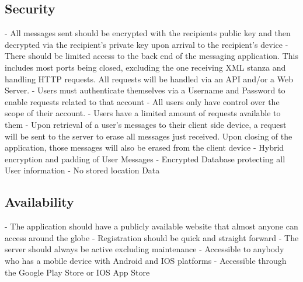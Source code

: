 \documentclass[11pt]{article}
\theoremstyle{plain}
\theoremstyle{definition}
\begin{document}
\subsection{Security}
- All messages sent should be encrypted with the recipients public key and then decrypted 
  via the recipient's private key upon arrival to the recipient's device
    \newline
- There should be limited access to the back end of the messaging application. This 
  includes most ports being closed, excluding the one receiving XML stanza and handling HTTP requests. All requests will be handled via an API and/or a Web Server.
    \newline
- Users must authenticate themselves via a Username and Password to enable requests related 
  to that account
    \newline
- All users only have control over the scope of their account.
  \newline
- Users have a limited amount of requests available to them
  \newline
- Upon retrieval of a user's messages to their client side device, a request will be sent to the server to erase all messages just received. Upon closing of the application, those messages will also be erased from the client device
  \newline
- Hybrid encryption and padding of User Messages \newline
- Encrypted Database protecting all User information \newline
- No stored location Data \newline

  
\subsection{Availability}
- The application should have a publicly available website that almost anyone can access 
  around the globe \newline
- Registration should be quick and straight forward \newline
- The server should always be active excluding maintenance \newline
- Accessible to anybody who has a mobile device with Android and IOS platforms \newline
- Accessible through the Google Play Store or IOS App Store \newline
\end{document}
